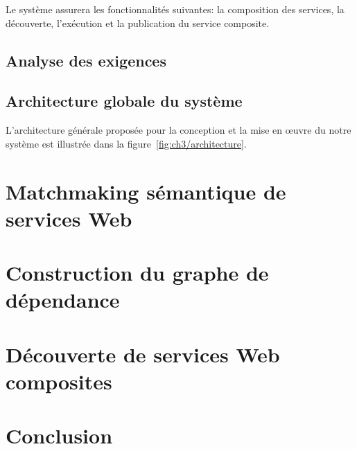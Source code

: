 Le système assurera les fonctionnalités suivantes: la composition des
services, la découverte, l'exécution et la publication du service
composite.

\subsection{Analyse des exigences}
\label{sec:ch3/presentation-requirements}

\newpage
\subsection{Architecture globale du système}
\label{sec:ch3/presentation-architecture}

L'architecture générale proposée pour la conception et la mise en
œuvre du notre système est illustrée dans la
figure~\ref{fig:ch3/architecture}.

 

\newpage
\section{Matchmaking sémantique de services Web}
\label{sec:ch3/semantic-matching}


\section{Construction du graphe de dépendance}
\label{sec:ch3/dependency-graph}

\section{Découverte de services Web composites}
\label{sec:ch3/composite-discovery}

\section*{Conclusion}
\label{sec:ch3/conclusion}
 


